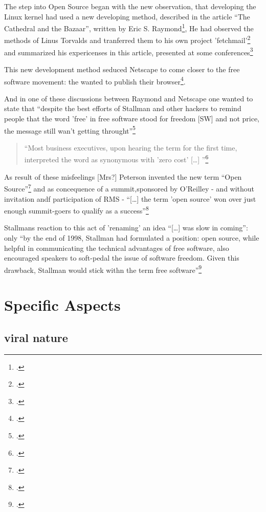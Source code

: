 \documentclass[DIV=calc,BCOR=5mm,11pt,headings=small,oneside,abstract=true, toc=bib]{scrartcl}
\begin{document}
The step into Open Source began with the new observation, that developing the
Linux kernel had used a new developing method, described in the article
\enquote{The Cathedral and the Bazaar}, written by Eric S.
Raymond\footcite[cf][159]{Williams2002a}, He had observed the methods of Linus
Torvalds and tranferred them to his own project
'fetchmail'\footcite[cf][158]{Williams2002a} and summarized his expericenses in
this article, presented at some conferences\footcite[cf][159]{Williams2002a}

This new development method seduced Netscape to come closer to the free software
movement: the wanted to publish their browser\footcite[cf][161]{Williams2002a}.

And in one of these discussions between Raymond and Netscape one wanted to state
that \enquote{despite the best efforts of Stallman and other hackers to
remind people that the word 'free' in free software stood for freedom
[SW] and not price, the message still wan't getting
throught}\footcite[cf][161f]{Williams2002a}

\begin{quote}
\enquote{Most business executives, upon hearing the term for the first time,
interpreted the word as synonymous with 'zero cost' [\ldots]
}\footcite[][162]{Williams2002a}
\end{quote}

As result of these misfeelings  [Mrs?] Peterson invented the new term
\enquote{Open Source}\footcite[cf][162]{Williams2002a} and as concequence of
a summit,sponsored by O'Reilley - and without invitation andf participation of
RMS - \enquote{[\ldots] the term 'open source' won over just enough
summit-goers to qualify as a success}\footcite[cf][162f]{Williams2002a}

Stallmans reaction to this act of 'renaming' an idea \enquote{[\ldots] was
slow in coming}: only \enquote{by the end of 1998, Stallman had
formulated a position: open source, while helpful in communicating the
technical advantages of free software, also encouraged speakers to
soft-pedal the issue of software freedom. Given this drawback, Stallman
would stick withn the term free
software}\footcite[cf][165]{Williams2002a}
\section{Specific Aspects}

\subsection{viral nature}
\end{document}
